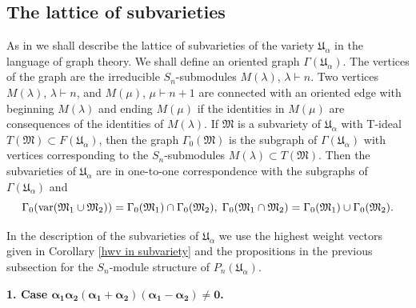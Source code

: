 \documentclass{amsart}
\theoremstyle{definition}
\begin{document}
\subsection{The lattice of subvarieties}
As in \cite{VDr} we shall describe the lattice of subvarieties of the variety ${\mathfrak U}_{\alpha}$ in the language of graph theory.
We shall define an oriented graph $\Gamma({\mathfrak U}_{\alpha})$.
The vertices of the graph are the irreducible $S_n$-submodules $M(\lambda)$, $\lambda\vdash n$.
Two vertices $M(\lambda)$, $\lambda\vdash n$, and $M(\mu)$, $\mu\vdash n+1$ are connected with an oriented edge
with beginning $M(\lambda)$ and ending $M(\mu)$ if the identities in $M(\mu)$ are consequences of the identities of $M(\lambda)$.
If $\mathfrak M$ is a subvariety of ${\mathfrak U}_{\alpha}$ with T-ideal $T({\mathfrak M})\subset F({\mathfrak U}_{\alpha})$,
then the graph $\Gamma_0({\mathfrak M})$ is the subgraph of $\Gamma({\mathfrak U}_{\alpha})$ with vertices corresponding to the $S_n$-submodules $M(\lambda)\subset T({\mathfrak M})$.
Then the subvarieties of ${\mathfrak U}_{\alpha}$ are in one-to-one correspondence with the subgraphs of $\Gamma({\mathfrak U}_{\alpha})$ and
\[
\Gamma_0(\text{\rm var}({\mathfrak M}_1\cup{\mathfrak M}_2))=\Gamma_0({\mathfrak M}_1)\cap \Gamma_0({\mathfrak M}_2),\;
\Gamma_0({\mathfrak M}_1\cap{\mathfrak M}_2)=\Gamma_0({\mathfrak M}_1)\cup \Gamma_0({\mathfrak M}_2).
\]

In the description of the subvarieties of ${\mathfrak U}_{\alpha}$ we use the highest weight vectors given in Corollary \ref{hwv in subvariety}
and the propositions in the previous subsection for the $S_n$-module structure of $P_n({\mathfrak U}_{\alpha})$.

{\bf 1. Case $\bm{\alpha_1\alpha_2(\alpha_1+\alpha_2)(\alpha_1-\alpha_2)\not=0}$.}
\end{document}
